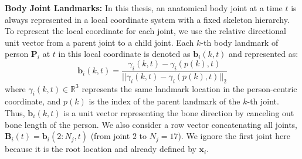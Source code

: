 \noindent \textbf{Body Joint Landmarks: } 
In this thesis, an anatomical body joint at a time $t$ is always represented in a local coordinate system with a fixed skeleton hierarchy. To represent the local coordinate for each joint, we use the relative directional unit vector from a parent joint to a child joint. Each $k$-th body landmark of person $\mathbf{P}_i$ at $t$ in this local coordinate is denoted as $\mathbf{b}_i(k, t)$ and represented as:
\begin{equation}
\mathbf{b}_i(k, t) = \frac{\gamma_i(k, t)  -  \gamma_i ({p(k)}, t)} {|| \gamma_i (k, t)  -  \gamma_i (p(k),t)  ||_2}
\end{equation}
where $\gamma_i (k,t) \in \mathbb{R}^3$ represents the same landmark location in the person-centric coordinate, and $p(k)$ is the index of the parent landmark of the $k$-th joint. Thus, $\mathbf{b}_i(k,t)$ is a unit vector representing the bone direction by canceling out bone length of the person. We also consider a row vector concatenating all joints, $\mathbf{B}_i(t) = \mathbf{b}_i(2:N_j, t)$ (from joint $2$ to $N_j=17$). We ignore the first joint here because it is the root location and already defined by $\mathbf{x}_i$. 

%
%
%

